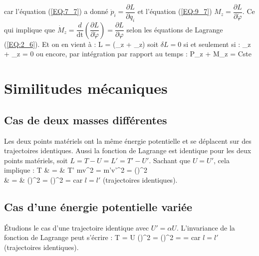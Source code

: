 \begin{itemize}
		\eenn
		car l'\'equation (\ref{EQ:7_7}) a donn\'e $\dot{p}_{i} = \dfrac{\partial L}{\partial q_{i}}$ et l'\'equation (\ref{EQ:9_7}) $M_{z} = \dfrac{\partial L}{\partial\dot{\varphi}}$. Ce qui implique que $\dot{M}_{z} = \dfrac{d}{\mathrm{dt}}\left(\dfrac{\partial L}{\partial\dot{\varphi}}\right) = \dfrac{\partial L}{\partial\varphi}$ selon les \'equations de Lagrange (\ref{EQ:2_6}). Et on en vient \`a :
		\benn
			\forall \delta\varphi\text{, }\delta L = \delta\varphi\left(_{z} + _{z}\right)
		\eenn
		soit $\delta L = 0$ si et seulement si :
		\benn
			_{z} + _{z} = 0
		\eenn
		ou encore, par int\'egration par rapport au temps :
		\benn
			P_{z} + M_{z} = Cste
		\eenn
\end{itemize}

\section{Similitudes m\'ecaniques}

\subsection{Cas de deux masses diff\'erentes}

Les deux points mat\'eriels ont la m\^eme \'energie potentielle et se d\'eplacent sur des trajectoires identiques. Aussi la fonction de Lagrange est identique pour les deux points mat\'eriels, soit $L = T - U = L' = T' - U'$. Sachant que $U=U'$, cela implique :
\bea
	T & = & T' \Leftrightarrow {}mv^{2} = m'v'^{2} \Leftrightarrow {} = \left(\right)^{2} \nonumber \\
	\Leftrightarrow {} & = & \left(\right)^{2} \Leftrightarrow {} = \left(\right)^{2} \Leftrightarrow {} =  \nonumber
\eea
car $l=l'$ (trajectoires identiques).

\subsection{Cas d'une \'energie potentielle vari\'ee}

\'Etudions le cas d'une trajectoire identique avec $U' = \alpha U$. L'invariance de la fonction de Lagrange peut s'\'ecrire :
\benn
	\delta T = \delta U \Leftrightarrow \left(\right)^{2} =  \Leftrightarrow \left(\right)^{2} =  \Leftrightarrow {} = 
\eenn
car $l=l'$ (trajectoires identiques).

